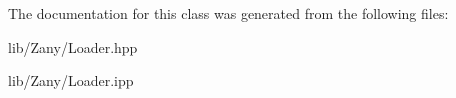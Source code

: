 The documentation for this class was generated from the following files\+:\begin{DoxyCompactItemize}
\item 
lib/\+Zany/Loader.\+hpp\item 
lib/\+Zany/Loader.\+ipp\end{DoxyCompactItemize}
